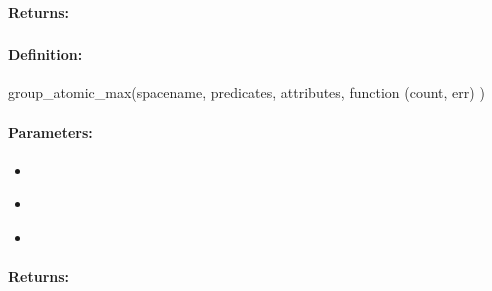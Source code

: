 \paragraph{Returns:}


\pagebreak
\subsubsection{}
\label{api:nodejs:group_atomic_max}


\paragraph{Definition:}
\begin{javascriptcode}
group_atomic_max(spacename, predicates, attributes, function (count, err) {})
\end{javascriptcode}
\paragraph{Parameters:}
\begin{itemize}[noitemsep]
\item {}\\

\item {}\\

\item {}\\

\end{itemize}

\paragraph{Returns:}


\pagebreak
\subsubsection{}
\label{api:nodejs:atomic_max}


